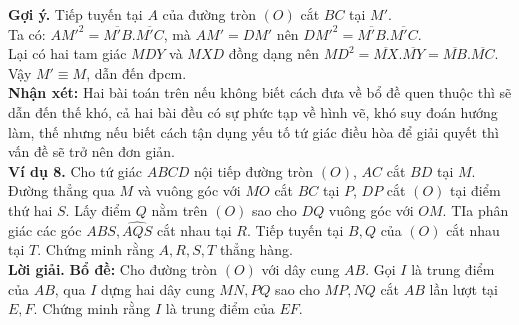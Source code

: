\documentclass[12pt,a4paper]{article}
\begin{document}
\textbf{Gợi ý.} Tiếp tuyến tại \(A\) của đường tròn \(\left( O \right)\) cắt \(BC\) tại \(M'\).\\
Ta có: \(A{{M'}^2} = \overline {M'B} .\overline {M'C} \), mà \(AM' = DM'\) nên \(D{{M'}^2} = \overline {M'B} .\overline {M'C} \).\\
Lại có hai tam giác \(MDY\) và \(MXD\) đồng dạng nên \(M{D^2} = \overline {MX} .\overline {MY}  = \overline {MB} .\overline {MC} \).\\
Vậy \(M' \equiv M\), dẫn đến đpcm.\\
\textbf{Nhận xét:} Hai bài toán trên nếu không biết cách đưa về bổ đề quen thuộc thì sẽ dẫn đến thế khó, cả hai bài đều có sự phức tạp về hình vẽ, khó suy đoán hướng làm, thế nhưng nếu biết cách tận dụng yếu tố tứ giác điều hòa để giải quyết thì vấn đề sẽ trở nên đơn giản.\\
\newline
\textbf{Ví dụ 8.} Cho tứ giác \(ABCD\) nội tiếp đường tròn \(\left( O \right)\), \(AC\) cắt \(BD\) tại \(M\). Đường thẳng qua \(M\) và vuông góc với \(MO\) cắt \(BC\) tại \(P\), \(DP\) cắt \(\left( O \right)\) tại điểm thứ hai \(S\). Lấy điểm \(Q\) nằm trên \(\left( O \right)\) sao cho \(DQ\) vuông góc với \(OM\). TIa phân giác các góc \(\widehat {ABS},\widehat {AQS}\) cắt nhau tại \(R\). Tiếp tuyến tại \(B, Q\) của \(\left( O \right)\) cắt nhau tại \(T\). Chứng minh rằng \(A, R, S, T\) thẳng hàng.\\
\textbf{Lời giải.}
\textbf{Bổ đề:} Cho đường tròn \(\left( O \right)\) với dây cung \(AB\). Gọi \(I\) là trung điểm của \(AB\), qua \(I\) dựng hai dây cung \(MN, PQ\) sao cho \(MP, NQ\) cắt \(AB\) lần lượt tại \(E, F\). Chứng minh rằng \(I\) là trung điểm của \(EF\).
\end{document}
